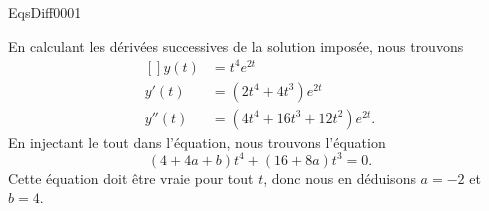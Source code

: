 
\begin{corrige}{EqsDiff0001}

En calculant les dérivées successives de la solution imposée, nous trouvons
\begin{equation}
	\begin{aligned}[]
		y(t)&=t^4 e^{2t}\\
		y'(t)&=(2t^4+4t^3) e^{2t}\\
		y''(t)&=(4t^4+16t^3+12t^2) e^{2t}.
	\end{aligned}
\end{equation}
En injectant le tout dans l'équation, nous trouvons l'équation
\begin{equation}
	(4+4a+b)t^4+(16+8a)t^3=0.
\end{equation}
Cette équation doit être vraie pour tout $t$, donc nous en déduisons $a=-2$ et $b=4$.

\end{corrige}

